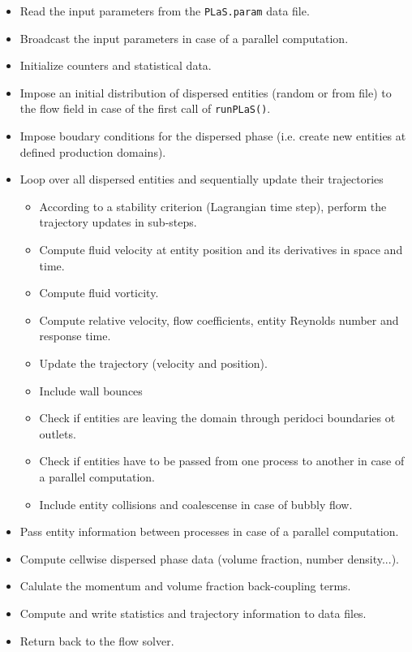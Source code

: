 \documentclass[12pt]{article}
\begin{document}
\begin{itemize}
\item Read the input parameters from the {\tt{PLaS.param}} data file.
\item Broadcast the input parameters in case of a parallel computation.
\item Initialize counters and statistical data.
\item Impose an initial distribution of dispersed entities (random or from file) to the flow field in case of the first call of {\tt{runPLaS()}}.
\item Impose boudary conditions for the dispersed phase (i.e. create new entities at defined production domains).
\item Loop over all dispersed entities and sequentially update their trajectories
\begin{itemize}
\item According to a stability criterion (Lagrangian time step), perform the trajectory updates in sub-steps.
\item Compute fluid velocity at entity position and its derivatives in space and time.
\item Compute fluid vorticity.
\item Compute relative velocity, flow coefficients, entity Reynolds number and response time.
\item Update the trajectory (velocity and position).
\item Include wall bounces
\item Check if entities are leaving the domain through peridoci boundaries ot outlets.
\item Check if entities have to be passed from one process to another in case of a parallel computation.
\item Include entity collisions and coalescense in case of bubbly flow.
\end{itemize}
\item Pass entity information between processes in case of a parallel computation.
\item Compute cellwise dispersed phase data (volume fraction, number density...).
\item Calulate the momentum and volume fraction back-coupling terms.
\item Compute and write statistics and trajectory information to data files.
\item Return back to the flow solver.
\end{itemize}
\end{document}
